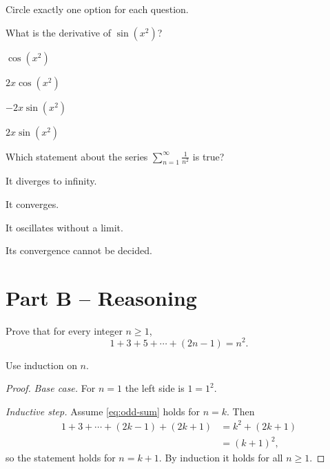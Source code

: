 \begin{note}
  Circle exactly one option for each question.
\end{note}
\begin{parts}
  \item What is the derivative of $\sin(x^{2})$?
    \begin{choices}
      \item $\cos(x^{2})$
      \item $2x\cos(x^{2})$
      \item $-2x\sin(x^{2})$
      \item $2x\sin(x^{2})$
    \end{choices}
  \item Which statement about the series $\displaystyle\sum_{n=1}^{\infty} \frac{1}{n^{2}}$ is true?
    \begin{choices}
      \item It diverges to infinity.
      \item It converges.
      \item It oscillates without a limit.
      \item Its convergence cannot be decided.
    \end{choices}
\end{parts}

\section*{Part B -- Reasoning}

Prove that for every integer $n \ge 1$,
\begin{equation}\label{eq:odd-sum}
  1 + 3 + 5 + \cdots + (2n-1) = n^{2}.
\end{equation}
\begin{note}[Hint]
  Use induction on $n$.
\end{note}

\begin{proof}
  \emph{Base case.} For $n = 1$ the left side is $1 = 1^{2}$.

  \emph{Inductive step.} Assume \eqref{eq:odd-sum} holds for $n = k$. Then
  \begin{align*}
    1 + 3 + \cdots + (2k-1) + (2k+1) &= k^{2} + (2k+1) \\
                                     &= (k+1)^{2},
  \end{align*}
  so the statement holds for $n = k+1$. By induction it holds for all $n \ge 1$.
\end{proof}

